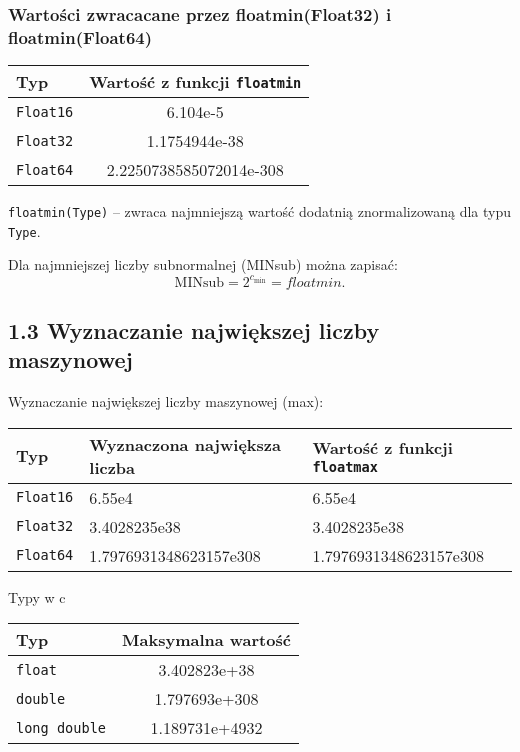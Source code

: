 \documentclass[a4paper,12pt]{article}
\begin{document}
\subsubsection{Wartości zwracacane przez floatmin(Float32) i floatmin(Float64)}
\begin{center}
\begin{tabular}{@{}l c@{}}
\hline
Typ & Wartość z funkcji \texttt{floatmin} \\
\hline
\texttt{Float16} & 6.104e-5 \\
\texttt{Float32} & 1.1754944e-38 \\
\texttt{Float64} & 2.2250738585072014e-308 \\
\hline
\end{tabular}
\end{center}

\texttt{floatmin(Type)} -- zwraca najmniejszą wartość dodatnią znormalizowaną dla typu \texttt{Type}.

Dla najmniejszej liczby subnormalnej (MINsub) można zapisać:
\[
\mathrm{MINsub} = 2^{c_{\min}} = floatmin.
\]

\subsection{ 1.3 Wyznaczanie największej liczby maszynowej}

Wyznaczanie największej liczby maszynowej (max):

\begin{center}
\begin{tabular}{@{}l l l@{}}
\hline
Typ & Wyznaczona największa liczba & Wartość z funkcji \texttt{floatmax} \\
\hline
\texttt{Float16} & 6.55e4 & 6.55e4 \\
\texttt{Float32} & 3.4028235e38 & 3.4028235e38 \\
\texttt{Float64} & 1.7976931348623157e308 & 1.7976931348623157e308 \\
\hline
\end{tabular}
\end{center}

Typy w c

\begin{center}
\begin{tabular}{@{}l c@{}}
\hline
Typ & Maksymalna wartość \\
\hline
\texttt{float} & 3.402823e+38 \\
\texttt{double} & 1.797693e+308 \\
\texttt{long double} & 1.189731e+4932 \\
\hline
\end{tabular}
\end{center}
\end{document}
